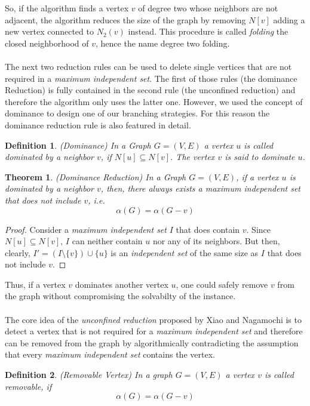 \documentclass[]{article}
\newtheorem{theorem}{Theorem}
\newtheorem{definition}{Definition}
\begin{document}
So, if the algorithm finds a vertex $v$ of degree two whose neighbors are not adjacent, the algorithm reduces the size of the graph by removing $N[v]$ adding a new vertex connected to $N_2(v)$ instead. This procedure is called \textit{folding} the closed neighborhood of $v$, hence the name degree two folding.\\\\
The next two reduction rules can be used to delete single vertices that are not required in a \textit{maximum independent set}. The first of those rules (the dominance Reduction) is fully contained in the second rule (the unconfined reduction) and therefore the algorithm only uses the latter one. However, we used the concept of dominance to design one of our branching strategies. For this reason the dominance reduction rule is also featured in detail.

\begin{definition} (Dominance)
	In a Graph $G=(V,E)$ a vertex $u$ is called dominated by a neighbor $v$, if $N[u]\subseteq N[v]$. The vertex $v$ is said to dominate $u$.
\end{definition}


\begin{theorem} (Dominance Reduction) In a Graph $G=(V,E)$, if a vertex $u$ is dominated by a neighbor $v$, then, there always exists a \textit{maximum independent set} that does not include $v$, i.e.\[\alpha(G)=\alpha(G-v)\]
\end{theorem}
\begin{proof}
Consider a \textit{maximum independent set} $I$ that does contain $v$. Since $N[u]\subseteq N[v]$, $I$ can neither contain $u$ nor any of its neighbors. But then, clearly, $I' = (I\setminus\{v\})\cup\{u\}$ is an \textit{independent set} of the same size as $I$ that does not include $v$.
\end{proof}
Thus, if a vertex $v$ dominates another vertex $u$, one could safely remove $v$ from the graph without compromising the solvabilty of the instance.\\\\
The core idea of the \textit{unconfined reduction} proposed by Xiao and Nagamochi \cite{XiaoNagamochi} is to detect a vertex that is not required for a \textit{maximum independent set} and therefore can be removed from the graph by algorithmically contradicting the assumption that every \textit{maximum independent set} contains the vertex.
\begin{definition} (Removable Vertex)
	In a graph $G=(V,E)$ a vertex $v$ is called removable, if 
	\[\alpha(G) = \alpha(G-v)\]
\end{definition}
\end{document}
